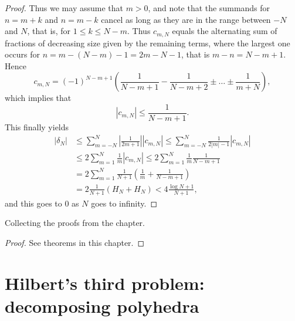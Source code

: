 \begin{proof}
  Thus we may assume that $m > 0$, and note that the summands for $n = m+k$ and $n = m-k$ cancel as long as they are in the range between $-N$ and $N$, that is, for $1 \le k \le N-m$.
  Thus $c_{m,N}$ equals the alternating sum of fractions of decreasing size given by the remaining terms, where the largest one occurs for $n = m-(N-m)-1 = 2m-N-1$, that is $m-n = N-m+1$.
  Hence
  \[
  c_{m,N} = (-1)^{N-m+1} \left( \frac{1}{N-m+1} - \frac{1}{N-m+2} \pm \dots \pm \frac{1}{m+N} \right),
  \]
  which implies that
  \[
  |c_{m,N}| \le \frac{1}{N-m+1}.
  \]
  This finally yields
  \begin{align*}
  |\delta_N| &\le \sum_{m=-N}^N \left|\frac{1}{2m+1}\right| |c_{m,N}| \le \sum_{m=-N}^N \frac{1}{2|m|-1} |c_{m,N}| \\
  &\le 2 \sum_{m=1}^N \frac{1}{m} |c_{m,N}| \le 2 \sum_{m=1}^N \frac{1}{m} \frac{1}{N-m+1} \\
  &= 2 \sum_{m=1}^N \frac{1}{N+1} \left( \frac{1}{m} + \frac{1}{N-m+1} \right) \\
  &= 2 \frac{1}{N+1} (H_N + H_N) < 4 \frac{\log N + 1}{N+1},
  \end{align*}
  and this goes to $0$ as $N$ goes to infinity.
\end{proof}


\begin{theorem}
  \label{four_proofs_euler_series}
  Collecting the proofs from the chapter.
\end{theorem}
\begin{proof}
  See theorems in this chapter.
\end{proof}


\chapter{Hilbert's third problem: decomposing polyhedra}


